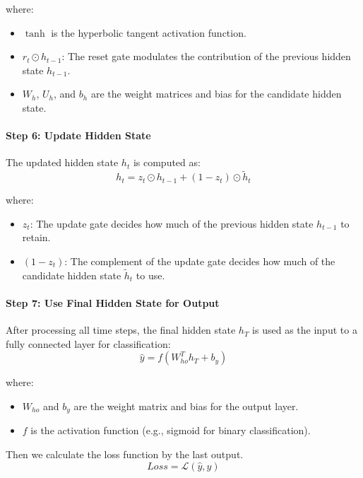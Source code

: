 \documentclass[12pt,a4paper]{article}
\begin{document}
where:
\begin{itemize}
    \item $\tanh$ is the hyperbolic tangent activation function.
    \item $r_t \odot h_{t-1}$: The reset gate modulates the contribution of the previous hidden state $h_{t-1}$.
    \item $W_h$, $U_h$, and $b_h$ are the weight matrices and bias for the candidate hidden state.
\end{itemize}

\paragraph{Step 6: Update Hidden State}
The updated hidden state $h_t$ is computed as:
\begin{equation}
    h_t = z_t \odot h_{t-1} + (1 - z_t) \odot \tilde{h}_t    
\end{equation}

where:
\begin{itemize}
    \item $z_t$: The update gate decides how much of the previous hidden state $h_{t-1}$ to retain.
    \item $(1 - z_t)$: The complement of the update gate decides how much of the candidate hidden state $\tilde{h}_t$ to use.
\end{itemize}

\paragraph{Step 7: Use Final Hidden State for Output}
After processing all time steps, the final hidden state $h_T$ is used as the input to a fully connected layer for classification:
\begin{equation}
    \hat{y} = f(W_{ho}^T h_T + b_y)    
\end{equation}

where:
\begin{itemize}
    \item $W_{ho}$ and $b_y$ are the weight matrix and bias for the output layer.
    \item $f$ is the activation function (e.g., sigmoid for binary classification).
\end{itemize}

Then we calculate the loss function by the last output.
\begin{equation}
    Loss = \mathcal{L}(\hat{y}, y)
\end{equation}
\end{document}
